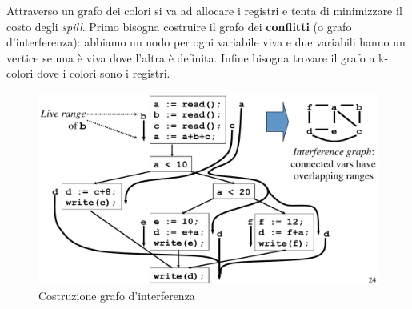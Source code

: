Attraverso un grafo dei colori si va ad allocare i registri e tenta di
minimizzare il costo degli \textit{spill}. Primo bisogna costruire il grafo dei
\textbf{conflitti} (o grafo d'interferenza): abbiamo un nodo per ogni variabile
viva e due variabili hanno un vertice se una \`e viva dove l'altra \`e
definita. Infine bisogna trovare il grafo a k-colori dove i colori sono i
registri.

\begin{figure}[H]
  \includegraphics[scale=0.4]{res/image/interference_graph}
  \caption{Costruzione grafo d'interferenza}
  \label{img:interference_graph}
\end{figure}

